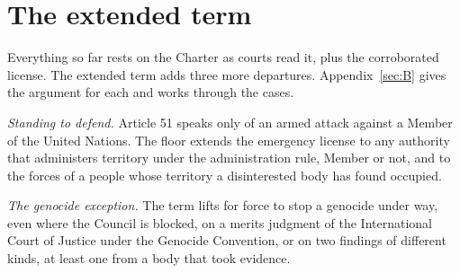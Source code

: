 \section{The extended term}
\label{sec:6.7}
Everything so far rests on the Charter as courts read it, plus the corroborated license. The extended term adds three more departures. Appendix~\ref{sec:B} gives the argument for each and works through the cases.

\emph{Standing to defend.} Article 51 speaks only of an armed attack against a Member of the United Nations. The floor extends the emergency license to any authority that administers territory under the administration rule, Member or not, and to the forces of a people whose territory a disinterested body has found occupied.

\emph{The genocide exception.} The term lifts for force to stop a genocide under way, even where the Council is blocked, on a merits judgment of the International Court of Justice under the Genocide Convention, or on two findings of different kinds, at least one from a body that took evidence.

